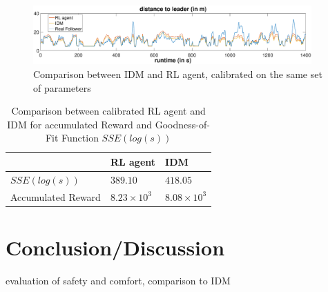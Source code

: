 \documentclass[review]{elsarticle}
\begin{document}
\begin{figure}
	
	\centering
	\includegraphics[width=0.95\textwidth]{images/IDMvsRL_dist}
	\caption{Comparison between IDM and RL agent, calibrated on the same set of parameters}
	\label{fig:IDMvsRL}
\end{figure}

\begin{table}
	\caption{Comparison between calibrated RL agent and IDM for accumulated Reward and Goodness-of-Fit Function $SSE(log(s))$} 
	\label{tab:objectiveFunc} 
	\begin{center}
		\begin{tabular}{p{} | p{} p{}  } 
			& RL agent & IDM   \\ \hline
			$SSE(log(s))$ & $389.10$ &  $418.05$	\\
			Accumulated Reward &  $8.23 \times 10^3$   & $8.08\times 10^3$
			
		\end{tabular}
	\end{center}
\end{table}


\section{Conclusion/Discussion}
evaluation of safety and comfort, comparison to IDM




\end{document}
